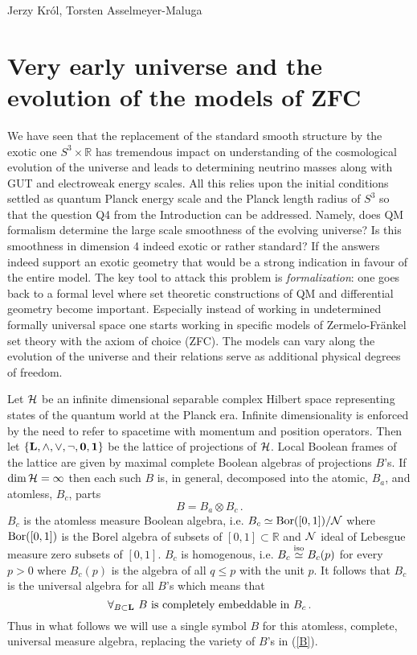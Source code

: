 \begin{artengenv2auth}{Jerzy Kr\'ol, Torsten Asselmeyer-Maluga}
\section{Very early universe and the evolution of the models of ZFC}
We have seen that
the replacement of the standard smooth structure by the exotic one $S^3\times \mathbb{R}$
has tremendous impact on understanding of the cosmological evolution of the universe and leads to determining neutrino masses along with GUT and electroweak energy scales. All this relies upon the initial conditions settled as quantum Planck energy scale and the Planck length radius of $S^3$ so that the question Q4 from the Introduction can be addressed. Namely, does QM formalism determine the large scale smoothness of the evolving universe? Is this smoothness in dimension 4 indeed exotic or rather standard? If the answers indeed support an exotic geometry that would be a strong indication in favour of the entire model. The key tool to attack this problem is {\em formalization}: one goes back to a formal level where set theoretic constructions of QM and differential geometry become important. Especially instead of working in undetermined formally universal space one starts working in specific models of Zermelo-Fr\"ankel set theory with the axiom of choice (ZFC). The models can vary along the evolution of the universe and their relations serve as additional physical degrees of freedom. 

Let ${\cal H}$ be an infinite dimensional separable complex Hilbert space representing states of the quantum world at the Planck era. Infinite dimensionality is enforced by the need to refer to spacetime with momentum and position operators. Then let $\{\bf{L},\wedge,\vee,\neg, 0,1\}$ be the lattice of projections of ${\cal H}$. Local Boolean frames of the lattice are given by maximal complete Boolean algebras of projections $B$'s. If $\dim {\cal H}=\infty $ then each such $B$ is, in general, decomposed into the atomic, $B_a$, and atomless, $B_c$, parts \parencite{Kappos1969}
\begin{equation}\label{B} B=B_a \otimes B_c\,. \end{equation}
$B_c$ is the atomless measure Boolean algebra, i.e. $B_c\simeq {\rm Bor}([0,1])/{\cal N}$ where ${\rm Bor}([0,1])$ is the Borel algebra of subsets of $[0,1]\subset \mathbb{R}$ and ${\cal N}$ ideal of Lebesgue measure zero subsets of $[0,1]$. $B_c$ is homogenous, i.e. $B_c \overset{\rm iso}{\simeq} B_c(p)$ for every $p>0$ where $B_c(p)$ is the algebra of all $q\leq p$ with the unit $p$. It follows that $B_c$ is the universal algebra for all $B$'s which means that 
\[ \forall_{B\subset {\bf L}}\ B{\text{ is completely embeddable in }} B_c \,.\]
Thus in what follows we will use a single symbol $B$ for this atomless, complete, universal measure algebra, replacing the variety of $B$'s in (\ref{B}). 


\end{artengenv2auth}
